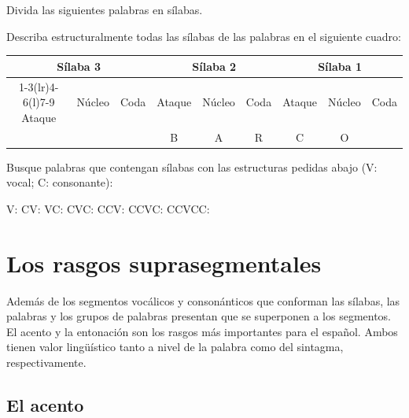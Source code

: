\begin{ejercicio}\label{ej:03-silabas}
\begin{consignas}
  \item Divida las siguientes palabras en sílabas.

  \item Describa estructuralmente todas las sílabas de las palabras en el
        siguiente cuadro:

        {\footnotesize
        \begin{tabular}{@{}*{9}{c}@{}}
          \toprule
          \multicolumn{3}{c}{Sílaba 3} & \multicolumn{3}{c}{Sílaba 2} & \multicolumn{3}{c}{Sílaba 1} \\
          \cmidrule(r){1-3}\cmidrule(lr){4-6}\cmidrule(l){7-9}
          Ataque & Núcleo & Coda & Ataque & Núcleo & Coda & Ataque & Núcleo & Coda \\
          \midrule
          & & & B & A & R & C & O & \\
          \bottomrule
        \end{tabular}}
  \item Busque palabras que contengan sílabas con las estructuras pedidas abajo
        (V: vocal; C: consonante):
        \begin{exe}
          \ex V: 
          \ex CV:
          \ex VC:
          \ex CVC:
          \ex CCV:
          \ex CCVC:
          \ex CCVCC:
        \end{exe}
\end{consignas}
\end{ejercicio}

\section{Los rasgos suprasegmentales}\label{sec:03-suprasegmentales}

Además de los segmentos vocálicos y consonánticos que conforman las sílabas, las
palabras y los grupos de palabras presentan 
que se superponen a los segmentos. El acento y la entonación son los rasgos más
importantes para el español. Ambos tienen valor lingüístico tanto a nivel de la
palabra como del sintagma, respectivamente.

\subsection{El acento}\label{sec:03-acento}

